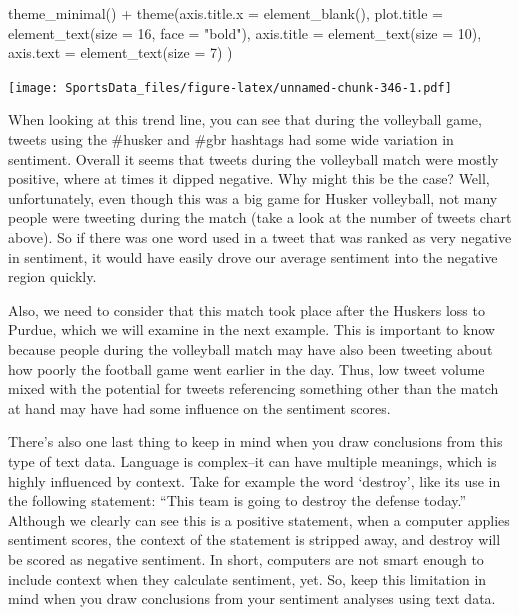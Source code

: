 \documentclass[
]{book}
\newenvironment{Shaded}{\begin{snugshade}}{\end{snugshade}}
\newcommand{\AttributeTok}[1]{\textcolor[rgb]{0.77,0.63,0.00}{#1}}
\newcommand{\DecValTok}[1]{\textcolor[rgb]{0.00,0.00,0.81}{#1}}
\newcommand{\FunctionTok}[1]{\textcolor[rgb]{0.00,0.00,0.00}{#1}}
\newcommand{\NormalTok}[1]{#1}
\newcommand{\SpecialCharTok}[1]{\textcolor[rgb]{0.00,0.00,0.00}{#1}}
\newcommand{\StringTok}[1]{\textcolor[rgb]{0.31,0.60,0.02}{#1}}
\begin{document}
\begin{Shaded}
\begin{Highlighting}[]
  \FunctionTok{theme\_minimal}\NormalTok{() }\SpecialCharTok{+}
  \FunctionTok{theme}\NormalTok{(}\AttributeTok{axis.title.x =} \FunctionTok{element\_blank}\NormalTok{(),}
        \AttributeTok{plot.title =} \FunctionTok{element\_text}\NormalTok{(}\AttributeTok{size =} \DecValTok{16}\NormalTok{, }\AttributeTok{face =} \StringTok{"bold"}\NormalTok{),}
    \AttributeTok{axis.title =} \FunctionTok{element\_text}\NormalTok{(}\AttributeTok{size =} \DecValTok{10}\NormalTok{),}
    \AttributeTok{axis.text =} \FunctionTok{element\_text}\NormalTok{(}\AttributeTok{size =} \DecValTok{7}\NormalTok{)}
\NormalTok{        )}
\end{Highlighting}
\end{Shaded}

\texttt{[image: SportsData\_files/figure-latex/unnamed-chunk-346-1.pdf]}

When looking at this trend line, you can see that during the volleyball game, tweets using the \#husker and \#gbr hashtags had some wide variation in sentiment. Overall it seems that tweets during the volleyball match were mostly positive, where at times it dipped negative. Why might this be the case? Well, unfortunately, even though this was a big game for Husker volleyball, not many people were tweeting during the match (take a look at the number of tweets chart above). So if there was one word used in a tweet that was ranked as very negative in sentiment, it would have easily drove our average sentiment into the negative region quickly.

Also, we need to consider that this match took place after the Huskers loss to Purdue, which we will examine in the next example. This is important to know because people during the volleyball match may have also been tweeting about how poorly the football game went earlier in the day. Thus, low tweet volume mixed with the potential for tweets referencing something other than the match at hand may have had some influence on the sentiment scores.

There's also one last thing to keep in mind when you draw conclusions from this type of text data. Language is complex--it can have multiple meanings, which is highly influenced by context. Take for example the word `destroy', like its use in the following statement: ``This team is going to destroy the defense today.'' Although we clearly can see this is a positive statement, when a computer applies sentiment scores, the context of the statement is stripped away, and destroy will be scored as negative sentiment. In short, computers are not smart enough to include context when they calculate sentiment, yet. So, keep this limitation in mind when you draw conclusions from your sentiment analyses using text data.
\end{document}

